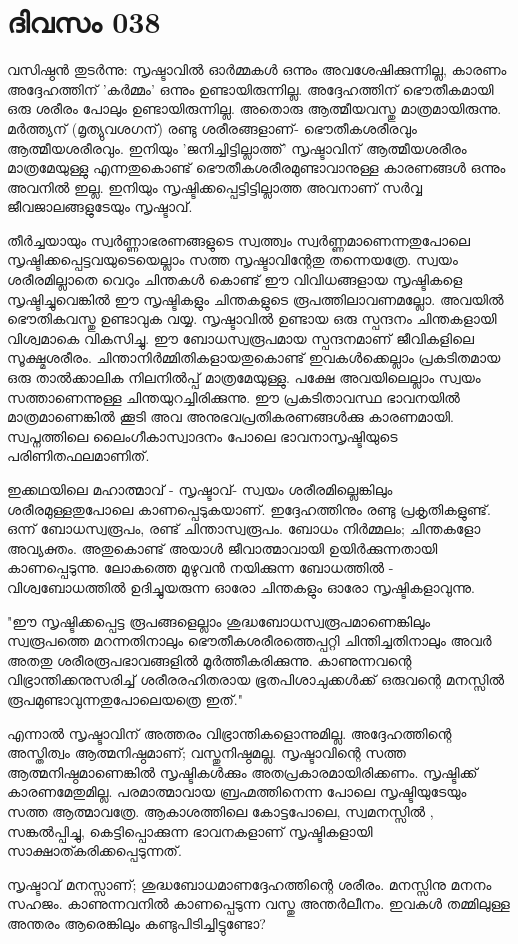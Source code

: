  
\section{ദിവസം 038}


വസിഷ്ഠന്‍ തുടര്‍ന്നു: സൃഷ്ടാവില്‍ ഓര്‍മ്മകള്‍ ഒന്നും അവശേഷിക്കുന്നില്ല, കാരണം അദ്ദേഹത്തിന്‌ 'കര്‍മ്മം' ഒന്നും ഉണ്ടായിരുന്നില്ല. അദ്ദേഹത്തിന്‌ ഭൌതീകമായി ഒരു ശരീരം പോലും ഉണ്ടായിരുന്നില്ല. അതൊരു ആത്മീയവസ്തു മാത്രമായിരുന്നു. മര്‍ത്ത്യന്‌ (മൃത്യുവശഗന്‌) രണ്ടു ശരീരങ്ങളാണ്‌- ഭൌതീകശരീരവും ആത്മീയശരീരവും. ഇനിയും 'ജനിച്ചിട്ടില്ലാത്ത്‌' സൃഷ്ടാവിന്‌ ആത്മീയശരീരം മാത്രമേയുള്ളു എന്നതുകൊണ്ട്‌ ഭൌതീകശരീരമുണ്ടാവാനുള്ള കാരണങ്ങള്‍ ഒന്നും അവനില്‍ ഇല്ല. ഇനിയും സൃഷ്ടിക്കപ്പെട്ടിട്ടില്ലാത്ത അവനാണ്‌ സര്‍വ്വ ജീവജാലങ്ങളുടേയും സൃഷ്ടാവ്‌. 

തീര്‍ച്ചയായും സ്വര്‍ണ്ണാഭരണങ്ങളുടെ സ്വത്ത്വം സ്വര്‍ണ്ണമാണെന്നതുപോലെ സൃഷ്ടിക്കപ്പെട്ടവയുടെയെല്ലാം സത്ത സൃഷ്ടാവിന്റേതു തന്നെയത്രേ. സ്വയം ശരീരമില്ലാതെ വെറും ചിന്തകള്‍ കൊണ്ട്‌ ഈ വിവിധങ്ങളായ സൃഷ്ടികളെ സൃഷ്ടിച്ചുവെങ്കില്‍ ഈ സൃഷ്ടികളും ചിന്തകളുടെ രൂപത്തിലാവണമല്ലോ. അവയില്‍ ഭൌതികവസ്തു ഉണ്ടാവുക വയ്യ. സൃഷ്ടാവില്‍ ഉണ്ടായ ഒരു സ്പന്ദനം ചിന്തകളായി വിശ്വമാകെ വികസിച്ചു. ഈ ബോധസ്വരൂപമായ സ്പന്ദനമാണ്‌ ജീവികളിലെ സൂക്ഷ്മശരീരം. ചിന്താനിര്‍മ്മിതികളായതുകൊണ്ട്‌ ഇവകള്‍ക്കെല്ലാം പ്രകടിതമായ ഒരു  താല്‍ക്കാലിക നിലനില്‍പ്പ്‌ മാത്രമേയുള്ളു. പക്ഷേ അവയിലെല്ലാം സ്വയം സത്താണെന്നുള്ള ചിന്തയുറച്ചിരിക്കുന്നു. ഈ പ്രകടിതാവസ്ഥ ഭാവനയില്‍ മാത്രമാണെങ്കില്‍ ക്കൂടി അവ അനുഭവപ്രതികരണങ്ങള്‍ക്കു കാരണമായി. സ്വപ്നത്തിലെ ലൈംഗീകാസ്വാദനം പോലെ ഭാവനാസൃഷ്ടിയുടെ പരിണിതഫലമാണിത്‌.

ഇക്കഥയിലെ മഹാത്മാവ്‌ - സൃഷ്ടാവ്‌- സ്വയം ശരീരമില്ലെങ്കിലും ശരീരമുള്ളതുപോലെ കാണപ്പെടുകയാണ്‌. ഇദ്ദേഹത്തിനും രണ്ടു പ്രകൃതികളുണ്ട്‌. ഒന്ന് ബോധസ്വരൂപം, രണ്ട്‌ ചിന്താസ്വരൂപം. ബോധം നിര്‍മ്മലം; ചിന്തകളോ അവ്യക്തം. അതുകൊണ്ട്‌ അയാള്‍ ജീവാത്മാവായി ഉയിര്‍ക്കുന്നതായി കാണപ്പെടുന്നു. ലോകത്തെ മുഴുവന്‍ നയിക്കുന്ന ബോധത്തില്‍ - വിശ്വബോധത്തില്‍ ഉദിച്ചുയരുന്ന ഓരോ ചിന്തകളും ഓരോ സൃഷ്ടികളാവുന്നു.

"ഈ സൃഷ്ടിക്കപ്പെട്ട രൂപങ്ങളെല്ലാം ശുദ്ധബോധസ്വരൂപമാണെങ്കിലും സ്വരൂപത്തെ മറന്നതിനാലും ഭൌതീകശരീരത്തെപ്പറ്റി ചിന്തിച്ചതിനാലും അവര്‍ അതതു ശരീരരൂപഭാവങ്ങളില്‍ മൂര്‍ത്തീകരിക്കുന്നു. കാണുന്നവന്റെ വിഭ്രാന്തിക്കനുസരിച്ച്‌ ശരീരരഹിതരായ ഭൂതപിശാചുക്കള്‍ക്ക്‌ ഒരുവന്റെ മനസ്സില്‍ രൂപമുണ്ടാവുന്നതുപോലെയത്രെ ഇത്‌."

എന്നാല്‍ സൃഷ്ടാവിന്‌ അത്തരം വിഭ്രാന്തികളൊന്നുമില്ല. അദ്ദേഹത്തിന്റെ അസ്തിത്വം ആത്മനിഷ്ഠമാണ്‌; വസ്തുനിഷ്ഠമല്ല. സൃഷ്ടാവിന്റെ സത്ത ആത്മനിഷ്ഠമാണെങ്കില്‍ സൃഷ്ടികള്‍ക്കും അതപ്രകാരമായിരിക്കണം. സൃഷ്ടിക്ക്‌ കാരണമേതുമില്ല. പരമാത്മാവായ ബ്രഹ്മത്തിനെന്ന പോലെ സൃഷ്ടിയുടേയും സത്ത ആത്മാവത്രേ. ആകാശത്തിലെ കോട്ടപോലെ, സ്വമനസ്സില്‍ , സങ്കല്‍പ്പിച്ചു, കെട്ടിപ്പൊക്കുന്ന ഭാവനകളാണ്‌ സൃഷ്ടികളായി സാക്ഷാത്കരിക്കപ്പെടുന്നത്‌. 

സൃഷ്ടാവ്‌ മനസ്സാണ്‌; ശുദ്ധബോധമാണദ്ദേഹത്തിന്റെ ശരീരം. മനസ്സിനു മനനം സഹജം. കാണുന്നവനില്‍ കാണപ്പെടുന്ന വസ്തു അന്തര്‍ലീനം. ഇവകള്‍ തമ്മിലുള്ള അന്തരം ആരെങ്കിലും കണ്ടുപിടിച്ചിട്ടുണ്ടോ?
